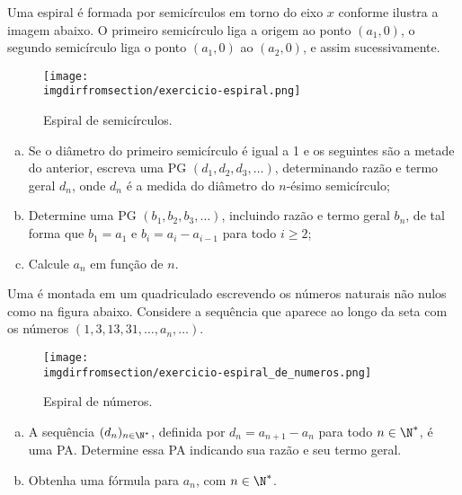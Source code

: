 \begin{exercise}\label{ex:espiral}
    Uma espiral é formada por semicírculos em torno do eixo $x$ conforme ilustra a imagem abaixo. O primeiro semicírculo liga a origem ao ponto $(a_1, 0)$, o segundo semicírculo liga o ponto $(a_1, 0)$ ao $(a_2, 0)$, e assim sucessivamente.
    \begin{figure}[H]
        \centering
        \label{fig:exercicio-espiral}
        \texttt{[image: \\imgdirfromsection/exercicio-espiral.png]}
		\caption{Espiral de semicírculos.}
    \end{figure}
    \begin{enumerate}[a)]
        \item Se o diâmetro do primeiro semicírculo é igual a 1 e os seguintes são a metade do anterior, escreva uma PG $(d_1, d_2, d_3 , \dots)$, determinando razão e termo geral $d_n$, onde $d_n$ é a medida do diâmetro do $n$-ésimo semicírculo;
        \item Determine uma PG $(b_1, b_2, b_3 , \dots)$, incluindo razão e termo geral $b_n$, de tal forma que $b_1 = a_1$ e $b_i = a_i - a_{i-1}$ para todo $i \geq 2$;
        \item Calcule $a_n$ em função de $n$.
        \end{enumerate}
\end{exercise}

\begin{exercise}
    Uma  é montada em um quadriculado escrevendo os números naturais não nulos como na figura abaixo. Considere a sequência que aparece ao longo da seta com os números $(1, 3, 13, 31, \dots , a_n, \dots)$.
    \begin{figure}[H]
        \centering
        \label{fig:exercicio-espiral}
        \texttt{[image: \\imgdirfromsection/exercicio-espiral\_de\_numeros.png]}
		\caption{Espiral de números.}
    \end{figure}
\begin{enumerate}[a)]
\item A sequência $(d_n)_{n \in \N^\ast}$, definida por $d_n = a_{n+1} - a_n$ para todo $n \in \N^\ast$, é uma PA. Determine essa PA indicando sua razão e seu termo geral.
\item Obtenha uma fórmula para $a_n$, com $n \in \N^\ast$.
\end{enumerate}
\end{exercise}


